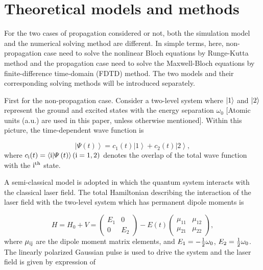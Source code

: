 \documentclass[10pt,letterpaper]{article}
\begin{document}
\section{Theoretical models and methods}
For the two cases of propagation considered or not, both the simulation model and the numerical solving method are different. In simple terms, here, non-propagation case need to solve the nonlinear Bloch equations by Runge-Kutta method and the propagation case need to solve the Maxwell-Bloch equations by finite-difference time-domain (FDTD) method. The two models and their corresponding solving methods will be introduced separately.

First for the non-propagation case. Consider a two-level system where $\left| {\rm{1}} \right\rangle$ and $\left| {\rm{2}} \right\rangle$ represent the ground and excited states with the energy separation $ \omega_0 $ [Atomic units (a.u.) are used in this paper, unless otherwise mentioned]. Within this picture, the time-dependent wave function is

\begin{equation}
\left| {\varPsi \left( t \right)} \right\rangle  = {c_1}(t)\left| 1 \right\rangle  + {c_2}(t)\left| 2 \right\rangle,
\label{eq1}
\end{equation}
where $ c_{\rm{i}}(t) = \left\langle {\rm{i}} | \varPsi \left( t \right) \right\rangle(\rm{i}=1,2) $ denotes the overlap of the total wave function with the $\rm{i}^{th}$ state.

A semi-classical model is adopted in which the quantum system interacts with the classical laser field. The total Hamiltonian describing the interaction of the laser field with the two-level system which has permanent dipole moments is \cite{YangWeifeng-Two-Level-PLA-2007}

\begin{equation}
H = {H_0} + V = \left( {\begin{array}{*{20}{c}}
	{{E_1}}&0\\
	0&{{E_2}}
	\end{array}} \right) - E(t)\left( {\begin{array}{*{20}{c}}
	{{\mu _{11}}}&{{\mu _{12}}}\\
	{{\mu _{21}}}&{{\mu _{22}}}
	\end{array}} \right),
\label{eq2}
\end{equation}
where $ \mu_{\rm{ij}} $ are the dipole moment matrix elements, and ${E_1} =  - {1 \over 2}{\omega _0}$, ${E_2} =   {1 \over 2}{\omega _0}$. The linearly polarized Gaussian pulse is used to drive the system and the laser field is given by expression of
\end{document}
